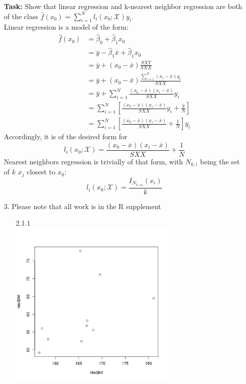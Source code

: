 \documentclass[11pt]{article}
\theoremstyle{definition}
\begin{document}
\begin{enumerate}
        \textbf{Task:} Show that linear regression and k-nearest neighbor regression are both of the class $\hat{f}(x_0)=\sum_{i=1}^N l_i(x_0;\mathcal{X})y_i$. \\
        Linear regression is a model of the form: \\
        \begin{align*}
            \hat{f}(x_0) &= \hat{\beta}_0 + \hat{\beta}_1 x_0
            \\ &= \bar{y} - \hat{\beta}_1 \bar{x} + \hat{\beta}_1 x_0
            \\ &= \bar{y} + (x_0 - \bar{x})\frac{SXY}{SXX}
            \\ &= \bar{y} + (x_0 - \bar{x})\frac{\sum_{i=1}^N (x_i - \bar{x})y_i}{SXX}
            \\ &= \bar{y} + \sum_{i=1}^N \frac{(x_0 - \bar{x})(x_i - \bar{x})}{SXX}y_i
            \\ &= \sum_{i=1}^N \left [ \frac{(x_0 - \bar{x})(x_i - \bar{x})}{SXX}y_i + \frac{\bar{y}}{N} \right ]
            \\ &= \sum_{i=1}^N \left [ \frac{(x_0 - \bar{x})(x_i - \bar{x})}{SXX} + \frac{1}{N} \right ]y_i
        \end{align*}
        Accordingly, it is of the desired form for 
        \[ l_i(x_0;\mathcal{X})=\frac{(x_0 - \bar{x})(x_i - \bar{x})}{SXX} + \frac{1}{N} \]
        Nearest neighbors regression is trivially of that form, with $N_{k,i}$ being the set of $k$ $x_j$ closest to $x_0$:
        \[ l_i(x_0;\mathcal{X})=\frac{I_{N_{k,x_0}}(x_i)}{k} \]
    \item[3.]
        Please note that all work is in the R supplement
        \begin{enumerate}
            \item[2.1.1]
                \\ \includegraphics[width=8cm]{hw1_2_1_1} \\ 

\end{enumerate}
\end{enumerate}
\end{document}
